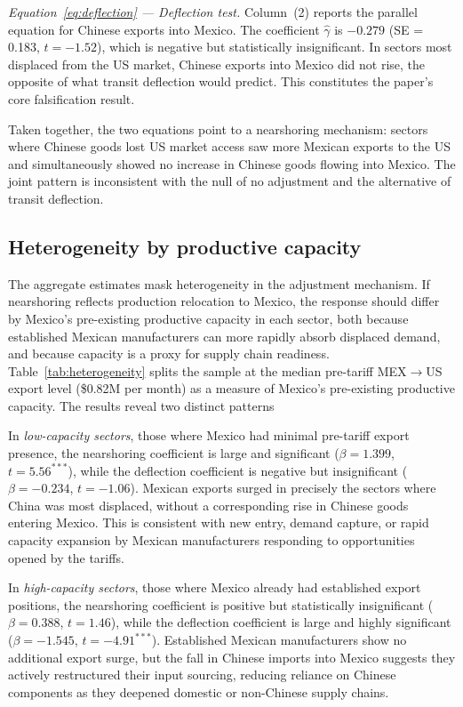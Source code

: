 \documentclass[11pt]{article}
\begin{document}
\textit{Equation~\eqref{eq:deflection} --- Deflection test.}
Column~(2) reports the parallel equation for Chinese exports into Mexico.
The coefficient $\hat{\gamma}$ is $-0.279$ (SE = 0.183, $t = -1.52$),
which is negative but statistically insignificant. In sectors most
displaced from the US market, Chinese exports into Mexico did not
rise, the opposite of what transit deflection would
predict. This constitutes the paper's core falsification result.

Taken together, the two equations point to a nearshoring mechanism:
sectors where Chinese goods lost US market access saw more Mexican exports
to the US and simultaneously showed no increase in Chinese goods flowing
into Mexico. The joint pattern is inconsistent with the null of no
adjustment and the alternative of transit deflection.

\FloatBarrier
\subsection{Heterogeneity by productive capacity}

The aggregate estimates mask heterogeneity in the adjustment
mechanism. If nearshoring reflects production relocation to
Mexico, the response should differ by Mexico's pre-existing
productive capacity in each sector, both because established Mexican
manufacturers can more rapidly absorb displaced demand, and because
capacity is a proxy for supply chain readiness. Table~\ref{tab:heterogeneity} splits the sample at the median pre-tariff
MEX$\to$US export level (\$0.82M per month) as a measure of Mexico's
pre-existing productive capacity. The results reveal two distinct patterns

In \textit{low-capacity sectors}, those where Mexico had minimal
pre-tariff export presence, the nearshoring coefficient is large and
significant ($\beta = 1.399$, $t = 5.56^{***}$), while the deflection
coefficient is negative but insignificant ($\beta = -0.234$,
$t = -1.06$). Mexican exports surged in precisely the sectors where China
was most displaced, without a corresponding rise in Chinese goods entering
Mexico. This is consistent with new entry, demand capture, or rapid
capacity expansion by Mexican manufacturers responding to 
opportunities opened by the tariffs.

In \textit{high-capacity sectors}, those where Mexico already had
established export positions, the nearshoring coefficient is positive
but statistically insignificant ($\beta = 0.388$, $t = 1.46$), while the
deflection coefficient is large and highly significant
($\beta = -1.545$, $t = -4.91^{***}$). Established Mexican manufacturers
show no additional export surge, but the fall in Chinese
imports into Mexico suggests they actively restructured their input
sourcing, reducing reliance on Chinese components as they deepened
domestic or non-Chinese supply chains.
\end{document}
